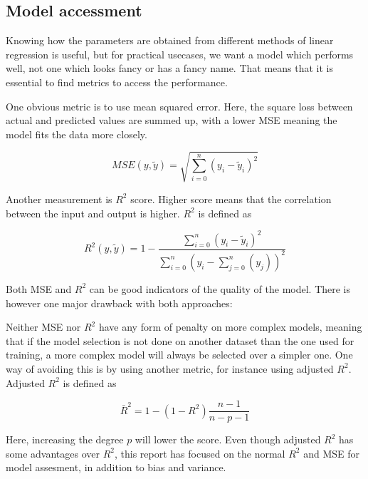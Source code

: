 \documentclass[12pt]{article}
\begin{document}
\subsection{Model accessment}

Knowing how the parameters are obtained from different methods of linear regression is useful, but for practical usecases, we want a model which performs well, not one which looks fancy or has a fancy name.
That means that it is essential to find metrics to access the performance.

One obvious metric is to use mean squared error.
Here, the square loss between actual and predicted values are summed up, with a lower MSE meaning the model fits the data more closely.

\begin{equation}
    MSE(y, \tilde{y})=\sqrt{\sum_{i=0}^{n} (y_i-\tilde{y}_i)^2}
\end{equation}

Another measurement is $R^2$ score. Higher score means that the correlation between the input and output is higher. $R^2$ is defined as

\begin{equation}
    R^2(y, \tilde{y}) = 1 - \frac{\sum_{i=0}^{n}(y_i-\tilde{y}_i)^2}{\sum_{i=0}^{n}(y_i-\sum_{j=0}^n(y_j))^2}
\end{equation}

Both MSE and $R^2$ can be good indicators of the quality of the model.
There is however one major drawback with both approaches:

Neither MSE nor $R^2$ have any form of penalty on more complex models, meaning that if the model selection is not done on another dataset than the one used for training, a more complex model will always be selected over a simpler one.
One way of avoiding this is by using another metric, for instance using adjusted $R^2$. Adjusted $R^2$ is defined as

\begin{equation}
    \bar{R}^2=1-(1-R^2)\frac{n-1}{n-p-1}
\end{equation}

Here, increasing the degree $p$ will lower the score.
Even though adjusted $R^2$ has some advantages over $R^2$, this report has focused on the normal $R^2$ and MSE for model assesment, in addition to bias and variance.

\end{document}
